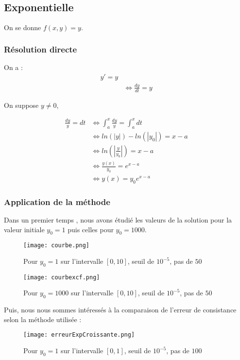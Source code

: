 \documentclass[a4paper, titlepage]{livret} %
\begin{document}
			\subsection{Exponentielle}
				On se donne $f(x,y) = y$.

				\subsubsection{Résolution directe}
				
				On a :
				\[\begin{aligned}
					y' = y \\
					& \Leftrightarrow \frac{dy}{dt} = y
				\end{aligned}\]

				On suppose $y \neq 0$,

				\[\begin{aligned}
					\frac{dy}{y} = dt
					& \Leftrightarrow \int_{a}^{x} \frac{dy}{y} =\int_{a}^{x} dt \\
					& \Leftrightarrow ln(|y|)-ln(|y_0|) = x-a \\
					& \Leftrightarrow ln(|\frac{y}{y_0}|)=x-a \\
					& \Leftrightarrow \frac{y(x)}{y_0} = e^{x-a} \\
					& \Leftrightarrow y(x)=y_{0}e^{x-a}
				\end{aligned}\]

				\subsubsection{Application de la méthode}
					Dans un premier temps , nous avons étudié les valeurs de la solution pour la valeur initiale $y_0=1$ puis celles pour $y_0=1000$.

					\begin{figure}[!h]
						\centering
  							\texttt{[image: courbe.png]}
  							\caption{Pour $y_0=1$ sur l'intervalle $[0,10]$, seuil de $10^{-5}$, pas de $50$}
					\end{figure}
	
					\begin{figure}[!h]
						\centering
  							\texttt{[image: courbexcf.png]}
  							\caption{Pour $y_0=1000$ sur l'intervalle $[0,10]$, seuil de $10^{-5}$, pas de $50$}
					\end{figure}
					\newpage

					Puis, nous nous sommes intéressés à la comparaison de l'erreur de consistance selon la méthode utilisée :
					\begin{figure}[!h]
						\centering
  							\texttt{[image: erreurExpCroissante.png]}
  							\caption{Pour $y_0=1$ sur l'intervalle $[0,1]$, seuil de $10^{-5}$, pas de $100$}
					\end{figure}
					\newpage
\end{document}
